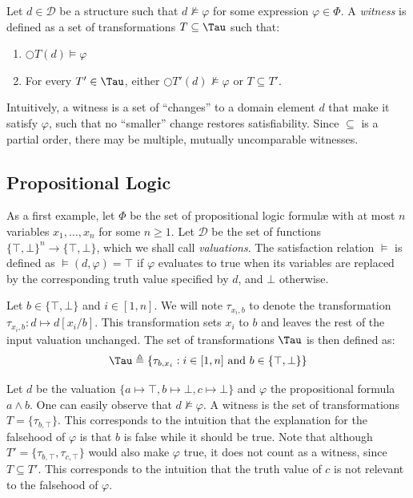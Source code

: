 Let $d \in \mathcal{D}$ be a structure such that $d \not\models \varphi$ for some expression $\varphi \in \Phi$. A \emph{witness} is defined as a set of transformations $T \subseteq \Tau$ such that:
%
\begin{enumerate}
\item $\bigcirc T(d) \models \varphi$
\item For every $T' \in \Tau$, either $\bigcirc T'(d) \not\models \varphi$ or $T \subseteq T'$.
\end{enumerate}

Intuitively, a witness is a set of ``changes'' to a domain element $d$ that make it satisfy $\varphi$, such that no ``smaller'' change restores satisfiability. Since $\subseteq$ is a partial order, there may be multiple, mutually uncomparable witnesses.

\subsection{Propositional Logic}

As a first example, let $\Phi$ be the set of propositional logic formul\ae{} with at most $n$ variables $x_1, \dots, x_n$ for some $n \geq 1$. Let $\mathcal{D}$ be the set of functions $\{\top,\bot\}^n \rightarrow \{\top,\bot\}$, which we shall call \emph{valuations}. The satisfaction relation $\models$ is defined as $\models(d, \varphi) = \top$ if $\varphi$ evaluates to true when its variables are replaced by the corresponding truth value specified by $d$, and $\bot$ otherwise.

Let $b \in \{\top,\bot\}$ and $i \in [1,n]$. We will note $\tau_{x_i,b}$ to denote the transformation $\tau_{x_i,b} : d \mapsto d[x_i/b]$. This transformation sets $x_i$ to $b$ and leaves the rest of the input valuation unchanged. The set of transformations $\Tau$ is then defined as:
\[
\Tau \triangleq \{\tau_{b,x_i} : i \in [1,n]\mbox{ and }b \in \{\top,\bot\}\}
\]

\begin{example}
Let $d$ be the valuation $\{a \mapsto \top, b \mapsto \bot, c \mapsto \bot\}$ and $\varphi$ the propositional formula $a \wedge b$. One can easily observe that $d \not\models \varphi$. A witness is the set of transformations $T= \{\tau_{b,\top}\}$. This corresponds to the intuition that the explanation for the falsehood of $\varphi$ is that $b$ is false while it should be true. Note that although $T'=\{\tau_{b,\top}, \tau_{c,\top}\}$ would also make $\varphi$ true, it does not count as a witness, since $T \subseteq T'$. This corresponds to the intuition that the truth value of $c$ is not relevant to the falsehood of $\varphi$.
\end{example}

